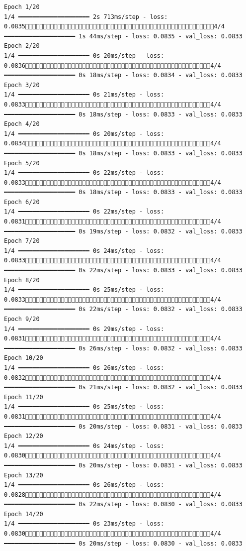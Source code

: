 \documentclass[
  letterpaper,
  DIV=11,
  numbers=noendperiod]{scrreprt}
\begin{document}
\begin{verbatim}
Epoch 1/20
1/4 ━━━━━━━━━━━━━━━━━━━━ 2s 713ms/step - loss: 0.08354/4 ━━━━━━━━━━━━━━━━━━━━ 1s 44ms/step - loss: 0.0835 - val_loss: 0.0833
Epoch 2/20
1/4 ━━━━━━━━━━━━━━━━━━━━ 0s 20ms/step - loss: 0.08364/4 ━━━━━━━━━━━━━━━━━━━━ 0s 18ms/step - loss: 0.0834 - val_loss: 0.0833
Epoch 3/20
1/4 ━━━━━━━━━━━━━━━━━━━━ 0s 21ms/step - loss: 0.08334/4 ━━━━━━━━━━━━━━━━━━━━ 0s 18ms/step - loss: 0.0833 - val_loss: 0.0833
Epoch 4/20
1/4 ━━━━━━━━━━━━━━━━━━━━ 0s 20ms/step - loss: 0.08344/4 ━━━━━━━━━━━━━━━━━━━━ 0s 18ms/step - loss: 0.0833 - val_loss: 0.0833
Epoch 5/20
1/4 ━━━━━━━━━━━━━━━━━━━━ 0s 22ms/step - loss: 0.08334/4 ━━━━━━━━━━━━━━━━━━━━ 0s 18ms/step - loss: 0.0833 - val_loss: 0.0833
Epoch 6/20
1/4 ━━━━━━━━━━━━━━━━━━━━ 0s 22ms/step - loss: 0.08314/4 ━━━━━━━━━━━━━━━━━━━━ 0s 19ms/step - loss: 0.0832 - val_loss: 0.0833
Epoch 7/20
1/4 ━━━━━━━━━━━━━━━━━━━━ 0s 24ms/step - loss: 0.08334/4 ━━━━━━━━━━━━━━━━━━━━ 0s 22ms/step - loss: 0.0833 - val_loss: 0.0833
Epoch 8/20
1/4 ━━━━━━━━━━━━━━━━━━━━ 0s 25ms/step - loss: 0.08334/4 ━━━━━━━━━━━━━━━━━━━━ 0s 22ms/step - loss: 0.0832 - val_loss: 0.0833
Epoch 9/20
1/4 ━━━━━━━━━━━━━━━━━━━━ 0s 29ms/step - loss: 0.08314/4 ━━━━━━━━━━━━━━━━━━━━ 0s 26ms/step - loss: 0.0832 - val_loss: 0.0833
Epoch 10/20
1/4 ━━━━━━━━━━━━━━━━━━━━ 0s 26ms/step - loss: 0.08324/4 ━━━━━━━━━━━━━━━━━━━━ 0s 21ms/step - loss: 0.0832 - val_loss: 0.0833
Epoch 11/20
1/4 ━━━━━━━━━━━━━━━━━━━━ 0s 25ms/step - loss: 0.08314/4 ━━━━━━━━━━━━━━━━━━━━ 0s 20ms/step - loss: 0.0831 - val_loss: 0.0833
Epoch 12/20
1/4 ━━━━━━━━━━━━━━━━━━━━ 0s 24ms/step - loss: 0.08304/4 ━━━━━━━━━━━━━━━━━━━━ 0s 20ms/step - loss: 0.0831 - val_loss: 0.0833
Epoch 13/20
1/4 ━━━━━━━━━━━━━━━━━━━━ 0s 26ms/step - loss: 0.08284/4 ━━━━━━━━━━━━━━━━━━━━ 0s 22ms/step - loss: 0.0830 - val_loss: 0.0833
Epoch 14/20
1/4 ━━━━━━━━━━━━━━━━━━━━ 0s 23ms/step - loss: 0.08304/4 ━━━━━━━━━━━━━━━━━━━━ 0s 20ms/step - loss: 0.0830 - val_loss: 0.0833

\end{verbatim}
\end{document}
